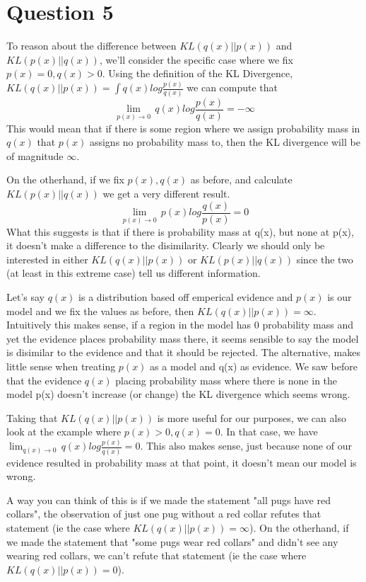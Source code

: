 \documentclass[]{article}
\begin{document}
    \section*{Question 5}
    \par To reason about the difference between $KL(q(x)||p(x))$ and $KL(p(x)||q(x))$, we'll consider the specific case where we fix $p(x) = 0, q(x) > 0$. Using the definition of the KL Divergence, $KL(q(x)||p(x)) = \int q(x) log\frac{p(x)}{q(x)}$ we can compute that $$\lim_{p(x)\rightarrow 0}\, q(x) log \frac{p(x)}{q(x)} = -\infty$$ This would mean that if there is some region where we assign probability mass in $q(x)$ that $p(x)$ assigns no probability mass to, then the KL divergence will be of magnitude $\infty$.
    
    \par On the otherhand, if we fix $p(x), q(x)$ as before, and calculate $KL(p(x)||q(x))$ we get a very different result. $$\lim_{p(x)\rightarrow 0} \, p(x) log \frac{q(x)}{p(x)} = 0$$ What this suggests is that if there is probability mass at q(x), but none at p(x), it doesn't make a difference to the disimilarity. Clearly we should only be interested in either $KL(q(x)||p(x))$ or $KL(p(x)||q(x))$ since the two (at least in this extreme case) tell us different information.
    
    \par Let's say $q(x)$ is a distribution based off emperical evidence and $p(x)$ is our model and we fix the values as before, then $KL(q(x)||p(x)) = \infty$. Intuitively this makes sense, if a region in the model has 0 probability mass and yet the evidence places probability mass there, it seems sensible to say the model is disimilar to the evidence and that it should be rejected. The alternative, makes little sense when treating $p(x)$ as a model and q(x) as evidence. We saw before that the evidence $q(x)$ placing probability mass where there is none in the model p(x) doesn't increase (or change) the KL divergence which seems wrong. 
    
    \par Taking that $KL(q(x)||p(x))$ is more useful for our purposes, we can also look at the example where $p(x)>0, q(x)=0$. In that case, we have $\lim_{q(x)\rightarrow 0} \, q(x) log \frac{p(x)}{q(x)} = 0$. This also makes sense, just because none of our evidence resulted in probability mass at that point, it doesn't mean our model is wrong. 
    
    \par A way you can think of this is if we made the statement "all pugs have red collars", the observation of just one pug without a red collar refutes that statement (ie the case where $KL(q(x)||p(x))=\infty$). On the otherhand, if we made the statement that "some pugs wear red collars" and didn't see any wearing red collars, we can't refute that statement (ie the case where $KL(q(x)||p(x))=0$). \cite{inftheory}
    
\end{document}
